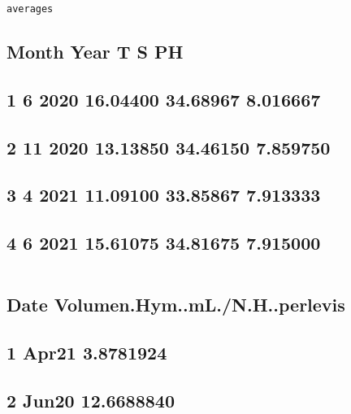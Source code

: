 \documentclass[
]{article}
\begin{document}
\begin{verbatim}
averages 
\end{verbatim}

\hypertarget{month-year-t-s-ph}{%
\subsection{Month Year T S PH}\label{month-year-t-s-ph}}

\hypertarget{section-29}{%
\subsection{1 6 2020 16.04400 34.68967 8.016667}\label{section-29}}

\hypertarget{section-30}{%
\subsection{2 11 2020 13.13850 34.46150 7.859750}\label{section-30}}

\hypertarget{section-31}{%
\subsection{3 4 2021 11.09100 33.85867 7.913333}\label{section-31}}

\hypertarget{section-32}{%
\subsection{4 6 2021 15.61075 34.81675 7.915000}\label{section-32}}

\begin{verbatim}
\end{verbatim}

\hypertarget{date-volumen.hym..ml.n.h..perlevis}{%
\subsection{Date
Volumen.Hym..mL./N.H..perlevis}\label{date-volumen.hym..ml.n.h..perlevis}}

\hypertarget{apr21-3.8781924}{%
\subsection{1 Apr21 3.8781924}\label{apr21-3.8781924}}

\hypertarget{jun20-12.6688840}{%
\subsection{2 Jun20 12.6688840}\label{jun20-12.6688840}}
\end{document}
